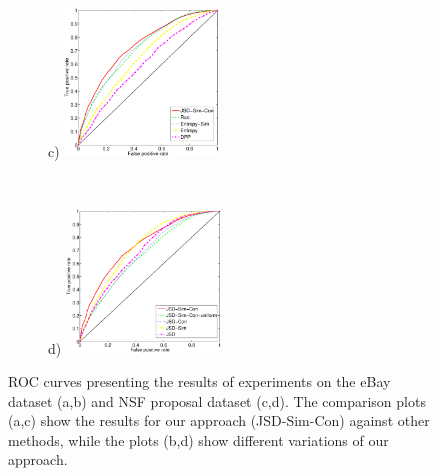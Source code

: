 \begin{figure}[t!]
  \begin{subfigure}
(c) \hspace{-1mm}
    \centering
    \includegraphics[width=0.45\textwidth]{figures/nsf-comparison-new.eps}
\hspace{3mm}
  \end{subfigure}%
  ~
  \begin{subfigure}
(d) \hspace{-1mm}
    \centering
    \includegraphics[width=0.45\textwidth]{figures/nsf-breakdown-new.eps}
  \end{subfigure}

  \caption{ROC curves presenting the results of experiments on
 the eBay dataset (a,b) and NSF proposal dataset (c,d). The
 comparison plots (a,c) show the results for our approach (JSD-Sim-Con)
 against other methods, while the plots (b,d)
 show different variations of our approach. }
\label{fig:roc-curves}
\end{figure}


